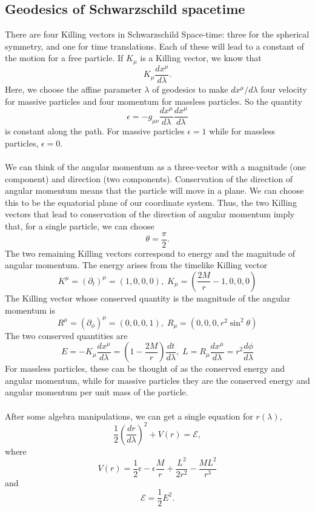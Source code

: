 \documentclass[cyan]{elegantnote}
\begin{document}
\subsection{Geodesics of Schwarzschild spacetime}
There are four Killing vectors in Schwarzschild Space-time: three for the spherical symmetry, and one for time translations.
Each of these will lead to a constant of the motion for a free particle.
If $K_{\mu}$ is a Killing vector, we know that
\[K_{\mu} \frac{dx^{\mu}}{d\lambda}.\]
Here, we choose the affine parameter $\lambda$ of geodesics to make $dx^{\mu}/d\lambda$ four velocity for massive particles and four momentum for massless particles. So the quantity
\[\epsilon = -g_{\mu\nu} \frac{dx^{\mu}}{d\lambda} \frac{dx^{\mu}}{d\lambda}\]
is constant along the path. For massive particles $\epsilon = 1$ while for massless particles, $\epsilon = 0$.
\\ \\
We can think of the angular momentum as a three-vector with a magnitude (one component) and direction (two components). 
Conservation of the direction of angular momentum means that the particle will move in a plane. We can choose this to be the equatorial plane of our coordinate system. Thus, the two Killing vectors that lead to conservation of the direction of angular momentum imply that, for a single particle, we can choose
\[\theta = \frac{\pi}{2}.\]
The two remaining Killing vectors correspond to energy and the magnitude of angular momentum. The energy arises from the timelike Killing vector
\[K^{\mu} = (\partial_t)^{\mu} = (1,0,0,0), \; K_{\mu} = (\frac{2M}{r}-1, 0,0,0)\]
The Killing vector whose conserved quantity is the magnitude of the angular momentum is
\[R^{\mu} = (\partial_{\phi})^{\mu} = (0,0,0,1), \; R_{\mu} = (0,0,0,r^2\sin^2\theta) \]
The two conserved quantities are
\[E = -K_{\mu} \frac{dx^{\mu}}{d\lambda} = \left( 1- \frac{2M}{r}\right) \frac{dt}{d\lambda}, \; L = R_{\mu} \frac{dx^{\mu}}{d\lambda} = r^2\frac{d\phi}{d\lambda}\]
For massless particles, these can be thought of as the conserved energy and angular momentum, while for massive particles they are the conserved energy and angular momentum per unit mass of the particle.
\\ \\
After some algebra manipulations, we can get a single equation for $r(\lambda)$,
\[\frac{1}{2} \left( \frac{dr}{d\lambda} \right)^2 + V(r) = \mathcal{E},\]
where
\[V(r) = \frac{1}{2}\epsilon - \epsilon \frac{M}{r} + \frac{L^2}{2r^2} - \frac{ML^2}{r^3}\]
and
\[\mathcal{E} = \frac{1}{2}E^2.\]
\end{document}
